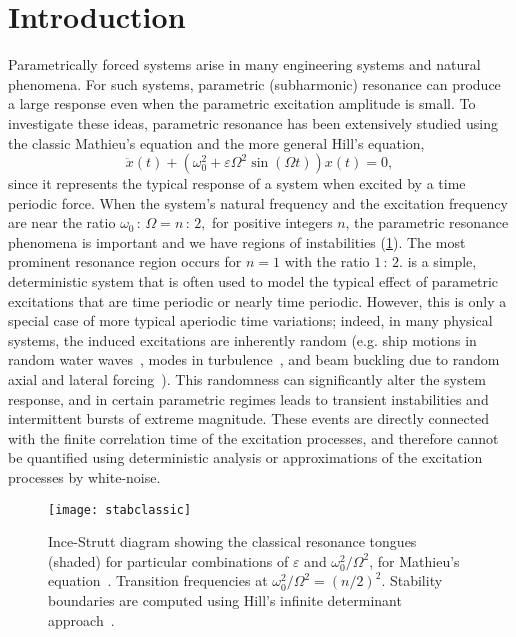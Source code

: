 \documentclass[3p]{elsarticle}
\begin{document}

\section{Introduction}
Parametrically forced systems arise in many engineering systems  and natural phenomena. 
For such systems, parametric (subharmonic) resonance can produce a large   response even when the parametric excitation amplitude is small.  To investigate these ideas, parametric resonance has been extensively  studied using  the classic  Mathieu's equation and the more general Hill's equation,
\begin{equation}\label{eq:simple_mat}
\ddot x(t) + (\omega_0^2  +\varepsilon\Omega^{2} \sin(\Omega t)) x(t) = 0,
\end{equation}
since it represents the typical response of a system when excited by a time periodic force.  When the system's natural frequency and the excitation frequency are near  the ratio $\omega_0 \,{:}\, \Omega = n \,{:}\, 2,$ for positive integers $n$, the parametric  resonance phenomena is important   and we have regions of instabilities (\cref{fig:strutt}). The most prominent resonance region occurs  for $n=1$ with the  ratio $1\,{:}\,2$.  is a simple, deterministic  system  that is often used to    model the typical effect of parametric excitations that are  time periodic or nearly time periodic. However, this is only a special case of   more typical aperiodic time variations; indeed, in many physical systems, the induced excitations are inherently random (e.g. ship motions in random water waves~\cite{Chai2015, Lin1995, Kougioumtzoglou2014, Kreuzer}, modes in turbulence~\cite{Majda2014a, tong15, qi15}, and beam buckling due to random axial and lateral forcing~\cite{Abou-Rayan1993, Lin_Cai95}). This randomness can significantly alter the system   response,  and in certain parametric regimes   leads to   transient instabilities and intermittent bursts of extreme magnitude. These events are directly connected with the finite correlation  time of the excitation processes, and therefore cannot be quantified using deterministic analysis or approximations of the excitation processes by white-noise. 
\begin{figure}[htb]
    \centering
    \texttt{[image: stabclassic]}
    \caption{Ince-Strutt diagram showing the classical resonance tongues (shaded) for particular combinations of $\varepsilon$ and $\omega_0^2/\Omega^2$, for    Mathieu's equation~. Transition frequencies at $\omega_0^2/\Omega^2= (n/2)^2$. Stability boundaries are  computed  using Hill's infinite determinant approach~\cite{nayfeh_mook}.}
    \label{fig:strutt}
\end{figure}
\end{document}
